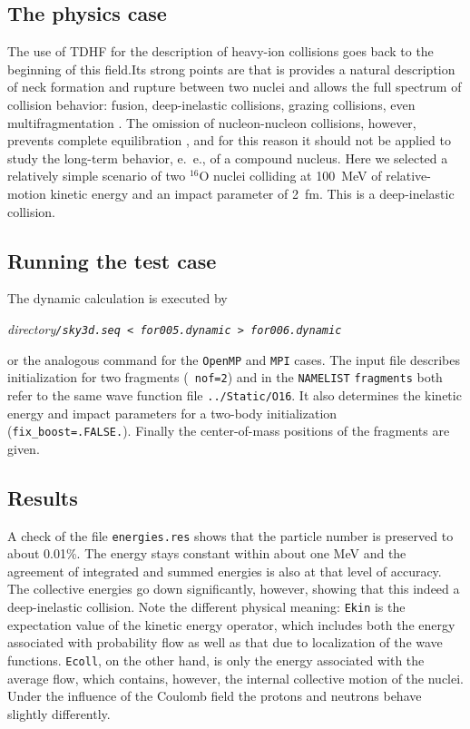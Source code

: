 \documentclass[A4]{elsarticle}
\begin{document}
\subsection{The physics case}
The use of TDHF for the description of heavy-ion collisions goes back
to the beginning of this field.Its strong points are that is provides
a natural description of neck formation and rupture between two nuclei
and allows the full spectrum of collision behavior: fusion,
deep-inelastic collisions, grazing collisions, even multifragmentation
\cite{simenel}. The omission of nucleon-nucleon collisions, however,
prevents complete equilibration \cite{loebl}, and for this reason it
should not be applied to study the long-term behavior, e.~e., of a
compound nucleus. Here we selected a relatively simple scenario of two
$^{16}$O nuclei colliding at 100~MeV of relative-motion kinetic energy
and an impact parameter of 2~fm. This is a deep-inelastic collision.

\subsection{Running the test case}
The dynamic calculation is executed by \\
%
\centerline{\em directory\tt/sky3d.seq < for005.dynamic > for006.dynamic} 
%
or the analogous command for the {\tt OpenMP} and {\tt MPI} cases.
The input file describes initialization for two fragments ({\tt
  nof=2}) and in the {\tt NAMELIST} {\tt fragments} both refer to the
same wave function file {\tt ../Static/O16}. It also determines the
kinetic energy and impact parameters for a two-body initialization
({\tt fix\_boost=.FALSE.}). Finally the center-of-mass positions of
the fragments are given.

\subsection{Results}
A check of the file {\tt energies.res} shows that the particle number
is preserved to about 0.01\%. The energy stays constant within about
one MeV and the agreement of integrated and summed energies is also at
that level of accuracy. The collective energies go down significantly,
however, showing that this indeed a deep-inelastic collision. Note the
different physical meaning: {\tt Ekin} is the expectation value of the
kinetic energy operator, which includes both the energy associated
with probability flow as well as that due to localization of the wave
functions. {\tt Ecoll}, on the other hand, is only the energy
associated with the average flow, which contains, however, the
internal collective motion of the nuclei. Under the influence of the
Coulomb field the protons and neutrons behave slightly differently.
\end{document}
